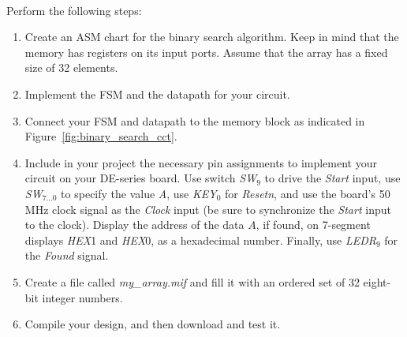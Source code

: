 \documentclass[epsfig,10pt,fullpage]{article}
\newcommand{\CommonDocsPath}{../../../common/docs}
\begin{document}
~\\
Perform the following steps:
\begin{enumerate}
\item Create an ASM chart for the binary search algorithm. Keep in mind that the memory
has registers on its input ports.  Assume that the array has a fixed size of 32 elements.
\item Implement the FSM and the datapath for your circuit.
\item Connect your FSM and datapath to the memory block as indicated in 
Figure~\ref{fig:binary_search_cct}.
\item Include in your project the necessary pin assignments to implement your circuit on
your DE-series board. Use switch {\it SW}$_{9}$ to drive the {\it Start} input, 
use {\it SW}$_{7{\ldots}0}$ to specify the value {\it A}, use 
{\it KEY}$_0$ for {\it Resetn}, and use the board's 50 MHz clock signal 
as the {\it Clock} input (be sure to synchronize the {\it Start} input to the clock). 
Display the address of the data $A$, if found, on 7-segment displays
{\it HEX}1 and {\it HEX}0, as a hexadecimal number.  Finally, use
{\it LEDR}$_{9}$ for the {\it Found} signal. 
\item Create a file called {\it my\_array.mif} and fill it with an ordered set of 32 
eight-bit integer numbers. 
\item Compile your design, and then download and test it.
\end{enumerate}



\end{document}

